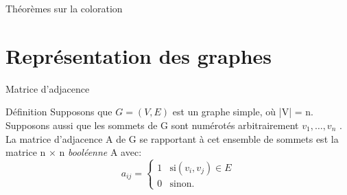 \documentclass[10pt,xcolor=dvipsnames]{beamer}
\begin{document}
\begin{frame}{Théorèmes sur la coloration}


\end{frame}



\section{Représentation des graphes}
\begin{frame}{Matrice d'adjacence}
    \begin{exampleblock}{Définition}
    Supposons que $G=(V,E)$ est un graphe simple, où |V| = n. Supposons aussi que les sommets de G sont numérotés arbitrairement $v_{1},\ldots ,v_{n}$ . La matrice d’adjacence A de G se rapportant à cet ensemble de sommets est la matrice n × n \textit{booléenne} A avec:
\begin{equation*}
  a_{ij} =
    \begin{cases}
      1 & \text{si} (v_i,v_j) \in E\\
      0 & \text{sinon.}
    \end{cases}       
\end{equation*}
    \end{exampleblock}
\end{frame}
\end{document}
